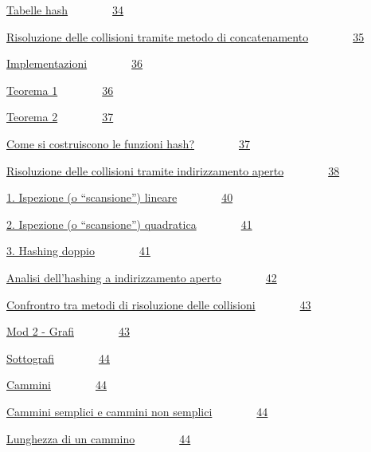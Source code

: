 \documentclass{article}
\begin{document}
{\protect\hyperlink{h.1gvh3qlqsocy}{Tabelle
hash}}{~~~~~~~~}{\protect\hyperlink{h.1gvh3qlqsocy}{34}}

{\protect\hyperlink{h.ocrobrrshwsz}{Risoluzione delle collisioni tramite
metodo di
concatenamento}}{~~~~~~~~}{\protect\hyperlink{h.ocrobrrshwsz}{35}}

{\protect\hyperlink{h.lhp1y3nzdu6x}{Implementazioni}}{~~~~~~~~}{\protect\hyperlink{h.lhp1y3nzdu6x}{36}}

{\protect\hyperlink{h.coagge9vpuqt}{Teorema
1}}{~~~~~~~~}{\protect\hyperlink{h.coagge9vpuqt}{36}}

{\protect\hyperlink{h.u0cyuvvucft2}{Teorema
2}}{~~~~~~~~}{\protect\hyperlink{h.u0cyuvvucft2}{37}}

{\protect\hyperlink{h.9kljpwmnt7yd}{Come si costruiscono le funzioni
hash?}}{~~~~~~~~}{\protect\hyperlink{h.9kljpwmnt7yd}{37}}

{\protect\hyperlink{h.3fhh68cy94hw}{Risoluzione delle collisioni tramite
indirizzamento
aperto}}{~~~~~~~~}{\protect\hyperlink{h.3fhh68cy94hw}{38}}

{\protect\hyperlink{h.i6sv1bn6gjla}{1. Ispezione (o ``scansione'')
lineare}}{~~~~~~~~}{\protect\hyperlink{h.i6sv1bn6gjla}{40}}

{\protect\hyperlink{h.83xwipol2nwy}{2. Ispezione (o ``scansione'')
quadratica}}{~~~~~~~~}{\protect\hyperlink{h.83xwipol2nwy}{41}}

{\protect\hyperlink{h.8kg9yyirra9i}{3. Hashing
doppio}}{~~~~~~~~}{\protect\hyperlink{h.8kg9yyirra9i}{41}}

{\protect\hyperlink{h.wkyvylqq2lrt}{Analisi dell'hashing a
indirizzamento
aperto}}{~~~~~~~~}{\protect\hyperlink{h.wkyvylqq2lrt}{42}}

{\protect\hyperlink{h.sg1b57l388xe}{Confrontro tra metodi di risoluzione
delle collisioni}}{~~~~~~~~}{\protect\hyperlink{h.sg1b57l388xe}{43}}

{\protect\hyperlink{h.fi9e3nt34nfb}{Mod 2 -
Grafi}}{~~~~~~~~}{\protect\hyperlink{h.fi9e3nt34nfb}{43}}

{\protect\hyperlink{h.5gj1hs8i1ooy}{Sottografi}}{~~~~~~~~}{\protect\hyperlink{h.5gj1hs8i1ooy}{44}}

{\protect\hyperlink{h.lxvflhr4q9d8}{Cammini}}{~~~~~~~~}{\protect\hyperlink{h.lxvflhr4q9d8}{44}}

{\protect\hyperlink{h.sjz08mn040is}{Cammini semplici e cammini non
semplici}}{~~~~~~~~}{\protect\hyperlink{h.sjz08mn040is}{44}}

{\protect\hyperlink{h.e18ltelmo48z}{Lunghezza di un
cammino}}{~~~~~~~~}{\protect\hyperlink{h.e18ltelmo48z}{44}}
\end{document}
